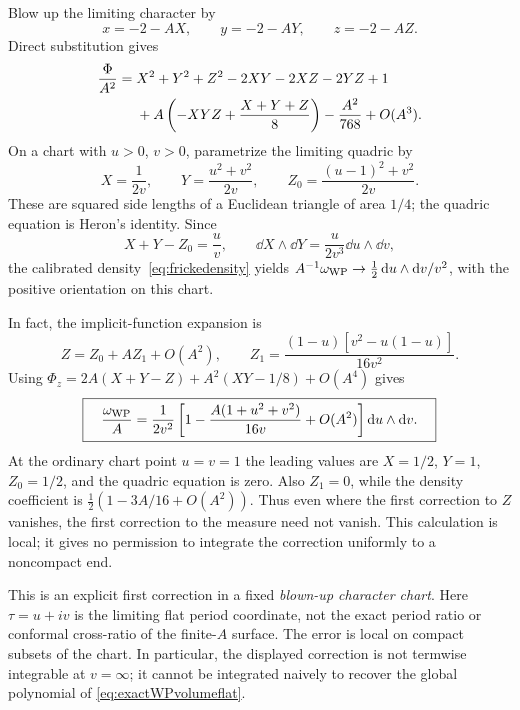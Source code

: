 Blow up the limiting character by
\begin{equation}
 x=-2-AX,\qquad y=-2-AY,\qquad z=-2-AZ.
 \label{eq:Frickeblowup}
\end{equation}
Direct substitution gives
\begin{align}
 \frac\Phi{A^2}
  ={}&X^2+Y^2+Z^2-2XY-2XZ-2YZ+1\notag\\
     &+A\left(-XYZ+\frac{X+Y+Z}{8}\right)
       -\frac{A^2}{768}+O(A^3).
 \label{eq:Frickeexpanded}
\end{align}
On a chart with $u>0$, $v>0$, parametrize the limiting quadric by
\begin{equation}
 X=\frac1{2v},\qquad
 Y=\frac{u^2+v^2}{2v},\qquad
 Z_0=\frac{(u-1)^2+v^2}{2v}.
 \label{eq:Frickeperiodchart}
\end{equation}
These are squared side lengths of a Euclidean triangle of area
$1/4$; the quadric equation is Heron's identity. Since
\[
 X+Y-Z_0=\frac uv,\qquad
 \dd X\wedge\dd Y=\frac{u}{2v^3}\dd u\wedge\dd v,
\]
the calibrated density~\eqref{eq:frickedensity} yields
$A^{-1}\omega_{\mathrm{WP}}\to\frac12\mathop{}\!\mathrm d u\wedge\mathop{}\!\mathrm d v/v^2$,
with the positive orientation on this chart.

In fact, the implicit-function expansion is
\[
 Z=Z_0+AZ_1+O(A^2),\qquad
 Z_1=\frac{(1-u)[v^2-u(1-u)]}{16v^2}.
\]
Using
$\Phi_z=2A(X+Y-Z)+A^2(XY-1/8)+O(A^4)$ gives
\begin{equation}
 \boxed{\quad
 \frac{\omega_{\mathrm{WP}}}A
  =\frac1{2v^2}\left[
       1-\frac{A(1+u^2+v^2)}{16v}+O(A^2)\right]
                    \mathop{}\!\mathrm d u\wedge\mathop{}\!\mathrm d v.
 \quad}
 \label{eq:Frickefirstcorrection}
\end{equation}
At the ordinary chart point $u=v=1$ the leading values are
$X=1/2$, $Y=1$, $Z_0=1/2$, and the quadric equation is zero.
Also $Z_1=0$, while the density coefficient is
$\tfrac12(1-3A/16+O(A^2))$. Thus even where the first correction
to $Z$ vanishes, the first correction to the measure need not vanish.
This calculation is local; it gives no permission to integrate
the correction uniformly to a noncompact end.

This is an explicit first correction in a fixed \emph{blown-up
character chart}. Here $\tau=u+iv$ is the limiting flat period
coordinate, not the exact period ratio or conformal cross-ratio
of the finite-$A$ surface. The error is local on compact subsets
of the chart. In particular, the displayed correction is not
termwise integrable at $v=\infty$; it cannot be integrated
naively to recover the global polynomial of
\eqref{eq:exactWPvolumeflat}.

